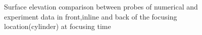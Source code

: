 \documentclass[preprint,12pt]{article}
\begin{document}
{\begin{figure}
\centering




\caption{Surface elevation comparison between probes of numerical and experiment data in front,inline and back of the focusing location(cylinder) at focusing time} \label{fig:NBR_fixed_WP}


\end{figure}}
\end{document}
